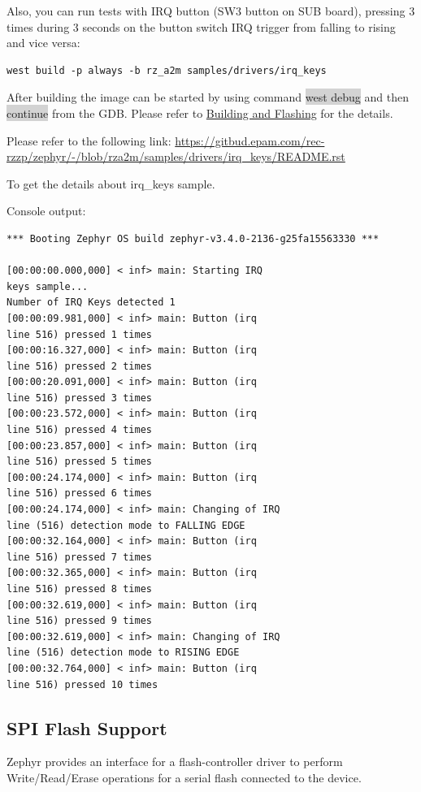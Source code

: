 \documentclass[11pt,a4paper,oneside]{article}
\begin{document}
Also, you can run tests with IRQ button (SW3 button on SUB board),
pressing 3 times during 3 seconds on the button switch IRQ trigger from
falling to rising and vice versa:

\begin{lstlisting}
west build -p always -b rz_a2m samples/drivers/irq_keys
\end{lstlisting}

After building the image can be started by using command \colorbox{lightgray}{west debug}
and then \colorbox{lightgray}{continue} from the GDB. Please refer to
\hyperref[building-and-flashing]{Building and Flashing} for the
details.

Please refer to the following link:
\url{https://gitbud.epam.com/rec-rzzp/zephyr/-/blob/rza2m/samples/drivers/irq_keys/README.rst}

To get the details about irq\_keys sample.

Console output:

\begin{lstlisting}
*** Booting Zephyr OS build zephyr-v3.4.0-2136-g25fa15563330 ***

[00:00:00.000,000] < inf> main: Starting IRQ
keys sample...
Number of IRQ Keys detected 1
[00:00:09.981,000] < inf> main: Button (irq
line 516) pressed 1 times
[00:00:16.327,000] < inf> main: Button (irq
line 516) pressed 2 times
[00:00:20.091,000] < inf> main: Button (irq
line 516) pressed 3 times
[00:00:23.572,000] < inf> main: Button (irq
line 516) pressed 4 times
[00:00:23.857,000] < inf> main: Button (irq
line 516) pressed 5 times
[00:00:24.174,000] < inf> main: Button (irq
line 516) pressed 6 times
[00:00:24.174,000] < inf> main: Changing of IRQ
line (516) detection mode to FALLING EDGE
[00:00:32.164,000] < inf> main: Button (irq
line 516) pressed 7 times
[00:00:32.365,000] < inf> main: Button (irq
line 516) pressed 8 times
[00:00:32.619,000] < inf> main: Button (irq
line 516) pressed 9 times
[00:00:32.619,000] < inf> main: Changing of IRQ
line (516) detection mode to RISING EDGE
[00:00:32.764,000] < inf> main: Button (irq
line 516) pressed 10 times
\end{lstlisting}

\subsection{SPI Flash Support}\label{spi-flash-support}

Zephyr provides an interface for a flash-controller driver to perform
Write/Read/Erase operations for a serial flash connected to the device.
\end{document}
